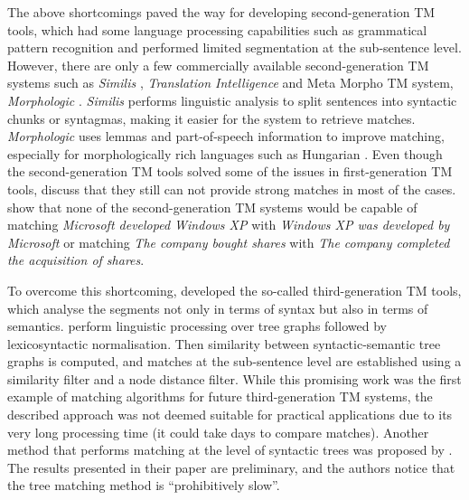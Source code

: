 The above shortcomings paved the way for developing second-generation TM tools, which had some language processing capabilities such as grammatical pattern recognition and performed limited segmentation at the sub-sentence level. However, there are only a few commercially available second-generation TM systems such as \textit{Similis} \autocite{planas2005similis}, \textit{Translation Intelligence} \autocite{gronroos2005bringing} and Meta Morpho TM system, \textit{Morphologic} \autocite{hodasz2005metamorpho}. \textit{Similis} \autocite{planas2005similis} performs linguistic analysis to split sentences into syntactic chunks or syntagmas, making it easier for the system to retrieve matches. \textit{Morphologic} uses lemmas and part-of-speech information to improve matching, especially for morphologically rich languages such as Hungarian \autocite{hodasz2005metamorpho}. Even though the second-generation TM tools solved some of the issues in first-generation TM tools, \textcite{mitkov2008improving} discuss that they still can not provide strong matches in most of the cases. \textcite{mitkov2008improving} show that none of the second-generation TM systems would be capable of matching \textit{Microsoft developed Windows XP} with \textit{Windows XP was developed by Microsoft} or matching \textit{The company bought shares} with \textit{The company completed the acquisition of shares}. 


To overcome this shortcoming, \textcite{pekar2007new} developed the so-called third-generation TM tools, which analyse the segments not only in terms of syntax but also in terms of semantics. \textcite{pekar2007new} perform linguistic processing over tree graphs \autocite{szpektor-etal-2004-scaling,10.1007/978-3-540-30586-6_1} followed by lexicosyntactic normalisation. Then similarity between syntactic-semantic tree graphs is computed, and matches at the sub-sentence level are established using a similarity filter and a node distance filter. While this promising work was the first example of matching algorithms for future third-generation TM systems, the described approach was not deemed suitable for practical applications due to its very long processing time (it could take days to compare matches). Another method that performs matching at the level of syntactic trees was proposed by \textcite{vanallemeersch2014improving}. The results presented in their paper are preliminary, and the authors notice that the tree matching method is ``prohibitively slow''.

